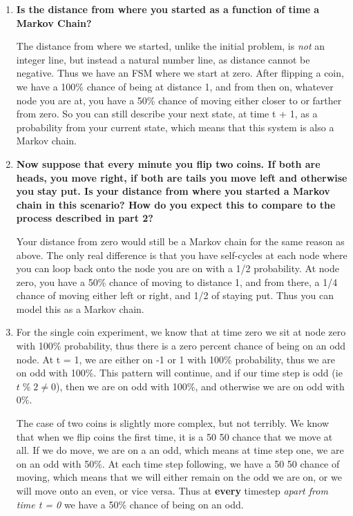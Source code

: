 \documentclass[11pt]{article}
\begin{document}
\begin{enumerate}
        \item \textbf{Is the distance from where you started as a function of time a
            Markov Chain?}

            The distance from where we started, unlike the initial problem, is
            \textit{not} an integer line, but instead a natural number line, as
            distance cannot be negative. Thus we have an FSM where we start at
            zero. After flipping a coin, we have a 100\% chance of being at
            distance 1, and from then on, whatever node you are at, you have a
            50\% chance of moving either closer to or farther from zero. So you
            can still describe your next state, at time t + 1, as a probability
            from your current state, which means that this system is also a
            Markov chain.
            \medskip

        \item \textbf{Now suppose that every minute you flip two coins. If both are 
            heads, you move right, if both are tails you move left and 
            otherwise you stay put. Is your distance from where you 
            started a Markov chain in this scenario? How do you expect this 
            to compare to the process described in part 2?}

            Your distance from zero would still be a Markov chain for the
            same reason as above. The only real difference is that you have
            self-cycles at each node where you can loop back onto the node you
            are on with a 1/2 probability. At node zero, you have a 50\% chance
            of moving to distance 1, and from there, a 1/4 chance of moving
            either left or right, and 1/2 of staying put. Thus you can model
            this as a Markov chain.
            \medskip

        \item For the single coin experiment, we know that at time zero we sit
            at node zero with 100\% probability, thus there is a zero percent
            chance of being on an odd node. At t = 1, we are either on -1 or 1
            with 100\% probability, thus we are on odd with 100\%. This pattern
            will continue, and if our time step is odd (ie $t\;\%\;2 \neq 0$),
            then we are on odd with 100\%, and otherwise we are on odd with
            0\%.

            The case of two coins is slightly more complex, but not terribly.
            We know that when we flip coins the first time, it is a 50 50
            chance that we move at all. If we do move, we are on a an odd,
            which means at time step one, we are on an odd with 50\%. At each
            time step following, we have a 50 50 chance of moving, which means
            that we will either remain on the odd we are on, or we will move
            onto an even, or vice versa. Thus at \textbf{every} timestep
            \textit{apart from time t = 0} we have a 50\% chance of being on an
            odd.


\end{enumerate}
\end{document}

